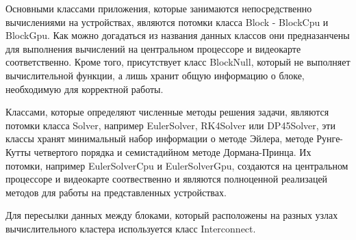 \documentclass[a4paper, 14pt]{article}
\theoremstyle{definition}
\begin{document}
\par Основными классами приложения, которые занимаются непосредственно вычислениями на устройствах, являются потомки класса Block - BlockCpu и BlockGpu. Как можно догадаться из названия данных классов они предназанчены для выполнения вычислений на центральном процессоре и видеокарте соответственно. Кроме того, присутствует класс BlockNull, который не выполняет вычислительной функции, а лишь хранит общую информацию о блоке, необходимую для 
корректной работы.

\par Классами, которые определяют численные методы решения задачи, являются потомки класса Solver, например EulerSolver, RK4Solver или DP45Solver, эти классы хранят минимальный набор информации о методе Эйлера, методе Рунге-Кутты четвертого порядка и семистадийном методе Дормана-Принца. Их потомки, например EulerSolverCpu и EulerSolverGpu, создаются на центральном процессоре и видеокарте соотвественно и являются полноценной реализацей методов для работы на представленных устройствах.

\par Для пересылки данных между блоками, который расположены на разных узлах вычислительного кластера используется класс Interconnect. 








\end{document}
